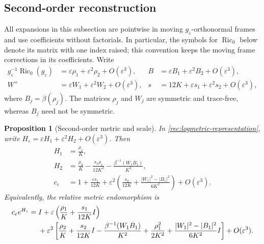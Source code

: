 \documentclass[11pt]{article}
\numberwithin{equation}{section}
\newtheorem{proposition}[theorem]{Proposition}
\theoremstyle{definition}
\theoremstyle{remark}
\DeclareMathOperator{\Ric}{Ric}
\begin{document}
\subsection{Second-order reconstruction}

All expansions in this subsection are pointwise in moving
$g_\varepsilon$-orthonormal frames and use coefficients without
factorials.  In particular, the symbols for $\Ric_0$ below denote
its matrix with one index raised; this convention keeps the moving
frame corrections in its coefficients.  Write
\begin{align}
 g_\varepsilon^{-1}\Ric_0(g_\varepsilon)
     &=\varepsilon\rho_1+\varepsilon^2\rho_2+O(\varepsilon^3),
 &B&=\varepsilon B_1+\varepsilon^2B_2+O(\varepsilon^3),
 \label{rec:rho-expansion}\\
 W^+&=\varepsilon W_1+\varepsilon^2W_2+O(\varepsilon^3),
 &s&=12K+\varepsilon s_1+\varepsilon^2s_2+O(\varepsilon^3),
 \label{rec:W-s-expansion}
\end{align}
where $B_j=\beta(\rho_j)$.  The matrices $\rho_j$ and $W_j$ are
symmetric and trace-free, whereas $B_j$ need not be symmetric.

\begin{proposition}[Second-order metric and scale]
\label{rec:second-order}
In \eqref{rec:logmetric-representation}, write
$H_\varepsilon=\varepsilon H_1+\varepsilon^2H_2+O(\varepsilon^3)$.
Then
\begin{align}
 H_1&=\frac{\rho_1}{K},
 \label{rec:H-first}\\
 H_2&=\frac{\rho_2}{K}
       -\frac{s_1\rho_1}{12K^2}
       -\frac{\beta^{-1}(W_1B_1)}{K^2},
 \label{rec:H-second}\\
 c_\varepsilon
   &=1+\frac{\varepsilon s_1}{12K}
       +\varepsilon^2\left(
           \frac{s_2}{12K}
           +\frac{|W_1|^2-|B_1|^2}{6K^2}\right)
       +O(\varepsilon^3).
 \label{rec:c-second}
\end{align}
Equivalently, the relative metric endomorphism is
\begin{align}
 c_\varepsilon e^{H_\varepsilon}
  ={}&I+\varepsilon\left(\frac{\rho_1}{K}
                                +\frac{s_1}{12K}I\right)\notag\\
    &+\varepsilon^2\left[
       \frac{\rho_2}{K}+\frac{s_2}{12K}I
       -\frac{\beta^{-1}(W_1B_1)}{K^2}
       +\frac{\rho_1^2}{2K^2}
       +\frac{|W_1|^2-|B_1|^2}{6K^2}I
                       \right]+O(\varepsilon^3).
 \label{rec:relative-metric-second}
\end{align}
\end{proposition}
\end{document}
